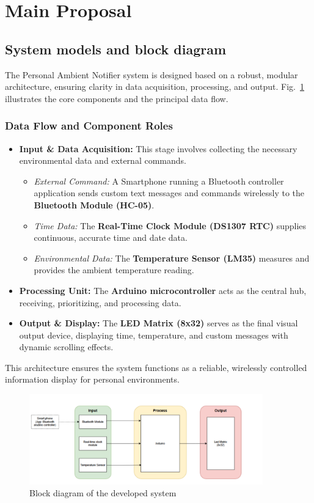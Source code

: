 \documentclass[a4paper, 10pt]{article}
\begin{document}
	\section{Main Proposal}
	
	\subsection{System models and block diagram}
	The Personal Ambient Notifier system is designed based on a robust, modular architecture, ensuring clarity in data acquisition, processing, and output. Fig.~\ref{fig:block_diagram} illustrates the core components and the principal data flow.
	
	\subsubsection{Data Flow and Component Roles}
	\begin{itemize}
		\item \textbf{Input \& Data Acquisition:} This stage involves collecting the necessary environmental data and external commands.
		\begin{itemize}
			\item \textit{External Command:} A Smartphone running a Bluetooth controller application sends custom text messages and commands wirelessly to the \textbf{Bluetooth Module (HC-05)}.
			\item \textit{Time Data:} The \textbf{Real-Time Clock Module (DS1307 RTC)} supplies continuous, accurate time and date data.
			\item \textit{Environmental Data:} The \textbf{Temperature Sensor (LM35)} measures and provides the ambient temperature reading.
		\end{itemize}
		\item \textbf{Processing Unit:} The \textbf{Arduino microcontroller} acts as the central hub, receiving, prioritizing, and processing data.
		\item \textbf{Output \& Display:} The \textbf{LED Matrix (8x32)} serves as the final visual output device, displaying time, temperature, and custom messages with dynamic scrolling effects.
	\end{itemize}
	This architecture ensures the system functions as a reliable, wirelessly controlled information display for personal environments.
	
	\begin{figure}[htbp]
		\centering
		\includegraphics[width=0.9\textwidth]{block_diagram.png}
		\caption{Block diagram of the developed system}
		\label{fig:block_diagram}
	\end{figure}
	
\end{document}
